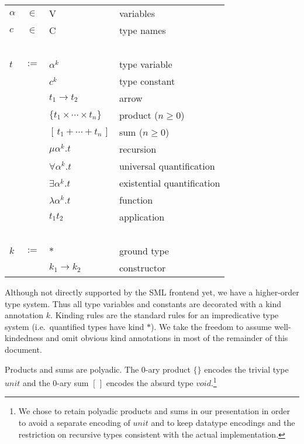 \documentclass[twoside]{article}
\newcommand{\conarrow}{\hookrightarrow}
\newcommand{\x}[1]{\mathit{#1}}
\newcommand{\f}[1]{\mbox{#1}}
\begin{document}
\begin{center}
\begin{tabular}{lcll}
$\alpha$&$\in$&	\f{V}				& variables \\
$c$	&$\in$&	\f{C}				& type names \\
\ \\

$t$	&$:=$&	$\alpha^k$			& type variable \\
	&&	$c^k$				& type constant \\
	&&	$t_1 \to t_2$			& arrow \\
	&&	$\{t_1 \times \cdots \times t_n\}$ & product ($n\geq0$) \\
	&&	$[\,t_1 + \cdots + t_n\,]$	& sum  ($n\geq0$) \\
	&&	$\mu \alpha^k . t$		& recursion \\
	&&	$\forall \alpha^k . t$		& universal quantification \\
	&&	$\exists \alpha^k . t$		& existential quantification \\
	&&	$\lambda \alpha^k . t$		& function \\
	&&	$t_1 t_2$			& application \\
\ \\

%
$k$	&$:=$&	$*$				& ground type \\
	&&	$k_1 \to k_2$			& constructor \\
\end{tabular}
\end{center}

Although not directly supported by the SML frontend yet, we have a higher-order type system. Thus all type variables and constants are decorated with a kind annotation $k$. Kinding rules are the standard rules for an impredicative type system (i.e.\ quantified types have kind $*$). We take the freedom to assume well-kindedness and omit obvious kind annotations in most of the remainder of this document.

Products and sums are polyadic. The 0-ary product $\{\}$ encodes the trivial
type $\x{unit}$ and the 0-ary sum $[\,]$ encodes the absurd type $\x{void}$.\footnote{We chose to retain polyadic products and sums in our presentation in order to avoid a separate encoding of $\x{unit}$ and to keep datatype encodings and the restriction on recursive types consistent with the actual implementation.}
\end{document}
